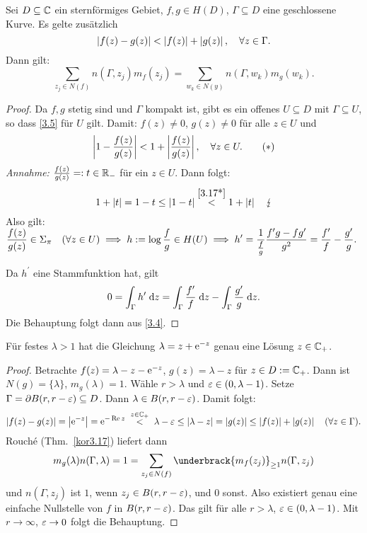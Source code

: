 \documentclass[a4paper,twoside,DIV15,BCOR12mm]{scrbook}
\begin{document}
\begin{kor}[Rouch\'e]\label{kor3.17}
Sei $D\subseteq\mathbb{C}$ ein sternförmiges Gebiet, $f,g\in H(D)$, $\Gamma\subseteq D$ eine geschlossene Kurve. Es gelte zusätzlich
\begin{equation}\label{3.5}
\left\lvert f(z)-g(z)\right\lvert<\left\lvert f(z)\right\lvert+\left\lvert g(z)\right\lvert,\quad\forall z\in\Gamma.
\end{equation}
Dann gilt:
\[\sum_{z_j\in N(f)}\!\!\!\!\! n(\Gamma,z_j)m_f(z_j) =\!\!\!\!\!\!\sum_{w_k\in N(y)}\!\!\!\!\!n(\Gamma,w_k)m_g(w_k).\]
\end{kor}
\begin{proof} Da $f,g$ stetig sind und $\Gamma$ kompakt ist, gibt es ein offenes $U\subseteq D$ mit $\Gamma\subseteq U$, so dass \eqref{3.5} für $U$ gilt. Damit: $f(z)\neq 0$, $g(z)\neq 0$ für alle $z\in U$ und
\[\label{3.17*}\left\lvert1-\frac{f(z)}{g(z)}\right\lvert < 1 + \left\lvert\frac{f(z)}{g(z)}\right\lvert,\quad\forall z\in U.\tag{$*$}\]
\textit{Annahme:} $\frac{f(z)}{g(z)} =: t \in \mathbb{R}_-$ für ein $z\in U$. Dann folgt:
\[1+\left\lvert t\right\lvert = 1-t \leq \left\lvert1-t\right\lvert \overset{\eqref{3.17*}}{<} 1 + \left\lvert t\right\lvert\quad\lightning\]
Also gilt: $\displaystyle\frac{f(z)}{g(z)}\in\Sigma_\pi\quad(\forall z\in U)\implies h:=\log\frac{f}{g}\in H(U)\implies h^\prime = \frac{1}{\frac{f}{g}}\frac{f^\prime g - fg^\prime}{g^2} = \frac{f^\prime}{f}-\frac{g^\prime}{g}.$

Da $h^\prime$ eine Stammfunktion hat, gilt
\[0 = \int_{\Gamma}^{}{h^\prime}\;\mathrm{d} z = \int_{\Gamma}^{}{\frac{f^\prime}{f}}\;\mathrm{d} z-\int_{\Gamma}^{}{\frac{g^\prime}{g}}\;\mathrm{d} z.\]
Die Behauptung folgt dann aus \eqref{3.4}.
\end{proof}

\begin{bsp}\label{bsp3.18}
  Für festes $\lambda>1$ hat die Gleichung $\lambda=z+\mathrm{e}^{-z}$ genau eine Lösung $z\in\mathbb{C}_+$.
\end{bsp}
\begin{proof}
  Betrachte $f(z)=\lambda-z-\mathrm{e}^{-z}$, $g(z)=\lambda-z$ für $z\in D:=\mathbb{C}_+$. Dann ist $N(g)=\{\lambda\}$, $m_g(\lambda)=1$. Wähle
  $r>\lambda$ und $\varepsilon\in(0,\lambda-1)$. Setze $\Gamma=\partial B(r,r-\varepsilon)\subseteq D$. Dann $\lambda\in B(r,r-\varepsilon)$. Damit folgt:
  \[ \abs{f(z)-g(z)} = \abs{\e^{-z}} = \e^{-\Re{z}} \wegen{<}{z\in\C_+} \lambda-\ep \leq \abs{\lambda-z} = \abs{g(z)} \leq
  \abs{f(z)} + \abs{g(z)} \quad (\forall z\in\Gamma). \]
  Rouch\'e (Thm.~\ref{kor3.17}) liefert dann
  \[ m_g(\lambda)n(\Gamma,\lambda) = 1 = \sum_{z_j\in N(f)}{\underbrack{m_f(z_j)}_{\ge1}n(\Gamma,z_j)} \]
  und $n(\Gamma,z_j)$ ist $1$, wenn $z_j\in B(r,r-\varepsilon)$, und $0$ sonst. Also existiert genau eine einfache Nullstelle von $f$ in
  $B(r,r-\varepsilon)$. Das gilt für alle $r>\lambda$, $\varepsilon\in(0,\lambda-1)$. Mit $r\to\infty$, $\varepsilon\to0$ folgt die Behauptung.
\end{proof}
\end{document}
